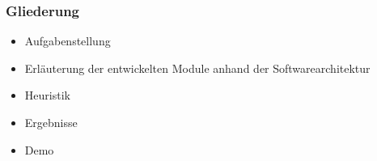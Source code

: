 \begin{frame}
	\frametitle{Gliederung}
		\begin{itemize}
			\item Aufgabenstellung
			\item Erläuterung der entwickelten Module anhand der Softwarearchitektur
			\item Heuristik
			\item Ergebnisse
			\item Demo
		\end{itemize}
\end{frame}